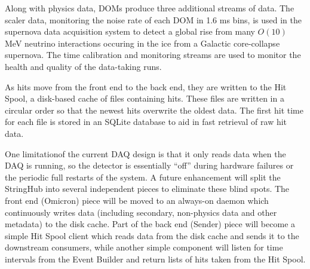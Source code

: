 

Along with physics data, DOMs produce three additional streams of data.
The scaler data, monitoring the noise rate of each DOM in 1.6 ms bins,
is used in the supernova data acquisition system \cite{sndaq} to detect a
global rise from many $O(10)$ MeV neutrino interactions occuring in the ice
from a Galactic core-collapse supernova.  The time calibration and monitoring
streams are used to monitor the health and quality of the data-taking runs.

As hits move from the front end to the back end, they are written to the
Hit Spool, a disk-based cache of files containing hits.  These files are
written in a circular order so that the newest hits overwrite the oldest data.
The first hit time for each file is stored in an SQLite database to aid in fast
retrieval of raw hit data.

One limitationof the current DAQ design is that it only reads data when the
DAQ is running, so the detector is essentially ``off'' during hardware failures
or the periodic full restarts of the system.  A future enhancement will split
the StringHub into several independent pieces to eliminate these blind spots.
The front end (Omicron) piece will be moved to an always-on daemon which
continuously writes data (including secondary, non-physics data and other
metadata) to the disk cache.  Part of the back end (Sender) piece will become a
simple Hit Spool client which reads data from the disk cache and sends it to
the downstream consumers, while another simple component will listen for time
intervals from the Event Builder and return lists of hits taken from the
Hit Spool.

